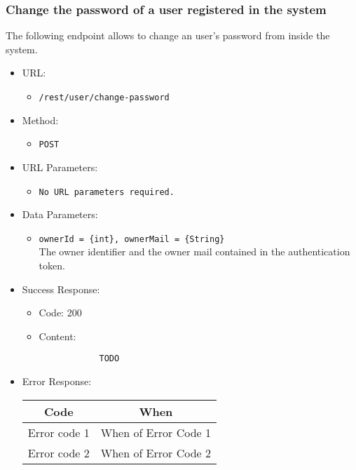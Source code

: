 \subsubsection*{Change the password of a user registered in the system}

The following endpoint allows to change an user's password from inside the system.

\begin{itemize}
    
    \item URL: 
    \begin{itemize}
        \item \texttt{/rest/user/change-password}
    \end{itemize}
    
    \item Method: 
    \begin{itemize}
        \item \texttt{POST}
    \end{itemize}
    
    \item URL Parameters: 
    \begin{itemize}
        \item \texttt{No URL parameters required.} 
    \end{itemize}
    
    \item Data Parameters: 
    \begin{itemize}
        \item \texttt{ownerId = \{int\}, ownerMail = \{String\}} \\
        The owner identifier and the owner mail contained in the authentication token.    
    \end{itemize}
    
    \item Success Response: 
    \begin{itemize}
        \item Code: 200
        \item Content:
        \begin{lstlisting}
            TODO
        \end{lstlisting}
    \end{itemize}
    
    \item Error Response:
    \begin{table}[!h]
    \centering 
    \begin{tabular}{|c|c|}
    \hline
    \multicolumn{1}{|c|}{\textbf{Code}} & \multicolumn{1}{c|}{\textbf{When}} \\ \hline
    Error code 1 & When of Error Code 1 \\\hline
    Error code 2 & When of Error Code 2 \\\hline
    \end{tabular} 
    \end{table} 
    
\end{itemize}



